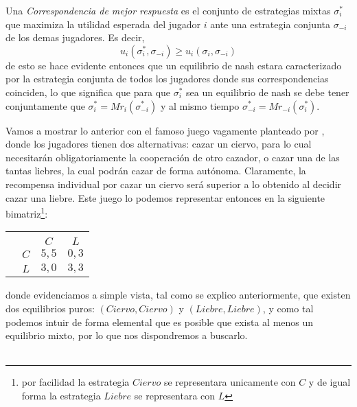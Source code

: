 \documentclass[11pt]{article}
\begin{document}
\begin{flushleft}
    Una \textit{Correspondencia de mejor respuesta} es el conjunto de estrategias mixtas $\sigma_i^*$ que maximiza la utilidad esperada del jugador $i$ ante una estrategia conjunta $\sigma_{-i}$ de los demas jugadores. Es decir, $$ u_i(\sigma_i^*,\sigma_{-i}) \geq u_i(\sigma_i,\sigma_{-i})$$ de esto se hace evidente entonces que un equilibrio de nash estara caracterizado por la estrategia conjunta de todos los jugadores donde sus correspondencias coinciden, lo que significa que para que $\sigma_i^*$ sea un equilibrio de nash se debe tener conjuntamente que $\sigma_i^*=Mr_i(\sigma_{-i}^*)$ y al mismo tiempo $\sigma_{-i}^*=Mr_{-i}(\sigma_{i}^*)$.

    \begin{example}
        \begin{flushleft}
            Vamos a mostrar lo anterior con el famoso juego vagamente planteado por \citet{Rousseau}, donde los jugadores tienen dos alternativas: cazar un ciervo, para lo cual necesitarán obligatoriamente la cooperación de otro cazador, o cazar una de las tantas liebres, la cual podrán cazar de forma autónoma. Claramente, la recompensa individual por cazar un ciervo será superior a lo obtenido al decidir cazar una liebre. Este juego lo podemos representar entonces en la siguiente bimatriz\footnote{por facilidad la estrategia $Ciervo$ se representara unicamente con $C$ y de igual forma la estrategia $Liebre$ se representara con $L$}:

            \begin{center}    
                    \setlength{\extrarowheight}{0pt}
                    \begin{tabular}{cc|c|c|}
                        & \multicolumn{1}{c}{}\\
                        & \multicolumn{1}{c}{} & \multicolumn{1}{c}{$C$}  & \multicolumn{1}{c}{$L$} \\\cline{3-4}
                        & $C$ & $5,5$ & $0,3$ \\\cline{3-4}
                        & $L$ & $3,0$ & $3,3$ \\\cline{3-4}
                    \end{tabular}
            \end{center}
    
            donde evidenciamos a simple vista, tal como se explico anteriormente, que existen dos equilibrios puros: $(Ciervo,Ciervo)$ y $(Liebre,Liebre)$, y como tal podemos intuir de forma elemental que es posible que exista al menos un equilibrio mixto, por lo que nos dispondremos a buscarlo.\\~\\
    

\end{flushleft}
\end{example}
\end{flushleft}
\end{document}
